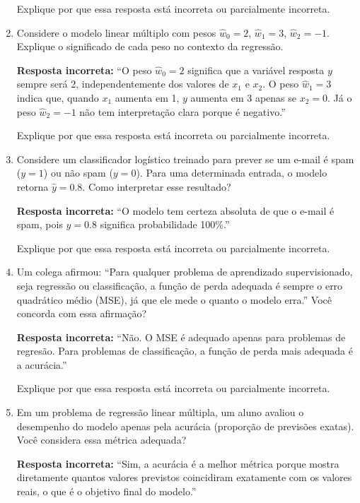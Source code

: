\documentclass[12pt]{article}
\begin{document}
\begin{enumerate}
    Explique por que essa resposta está incorreta ou parcialmente incorreta.

    \item Considere o modelo linear múltiplo com pesos \(\hat{w}_0 = 2\), \(\hat{w}_1 = 3\), \(\hat{w}_2 = -1\).  
    Explique o significado de cada peso no contexto da regressão.  

    \textbf{Resposta incorreta:}  
    “O peso \(\hat{w}_0 = 2\) significa que a variável resposta \(y\) sempre será 2, independentemente dos valores de \(x_1\) e \(x_2\).  
    O peso \(\hat{w}_1 = 3\) indica que, quando \(x_1\) aumenta em 1, \(y\) aumenta em 3 apenas se \(x_2 = 0\).  
    Já o peso \(\hat{w}_2 = -1\) não tem interpretação clara porque é negativo.”  

    Explique por que essa resposta está incorreta ou parcialmente incorreta.  



    \item Considere um classificador logístico treinado para prever se um e-mail é spam (\(y=1\)) ou não spam (\(y=0\)).  
    Para uma determinada entrada, o modelo retorna \(\hat{y} = 0.8\).  
    Como interpretar esse resultado?  

    \textbf{Resposta incorreta:}  
    “O modelo tem certeza absoluta de que o e-mail é spam, pois \(\hat{y} = 0.8\) significa probabilidade 100\%.”  

    Explique por que essa resposta está incorreta ou parcialmente incorreta.  

    \item Um colega afirmou:  
    “Para qualquer problema de aprendizado supervisionado, seja regressão ou classificação, a função de perda adequada é sempre o erro quadrático médio (MSE), já que ele mede o quanto o modelo erra.”  
    Você concorda com essa afirmação?  

    \textbf{Resposta incorreta:}  
    “Não. O MSE é adequado apenas para problemas de regresão. Para problemas de classificação, a função de perda mais adequada é a acurácia.”  

    Explique por que essa resposta está incorreta ou parcialmente incorreta.  

    \item Em um problema de regressão linear múltipla, um aluno avaliou o desempenho do modelo apenas pela acurácia (proporção de previsões exatas).  
    Você considera essa métrica adequada?  

    \textbf{Resposta incorreta:}  
    “Sim, a acurácia é a melhor métrica porque mostra diretamente quantos valores previstos coincidiram exatamente com os valores reais, o que é o objetivo final do modelo.”  


\end{enumerate}
\end{document}
